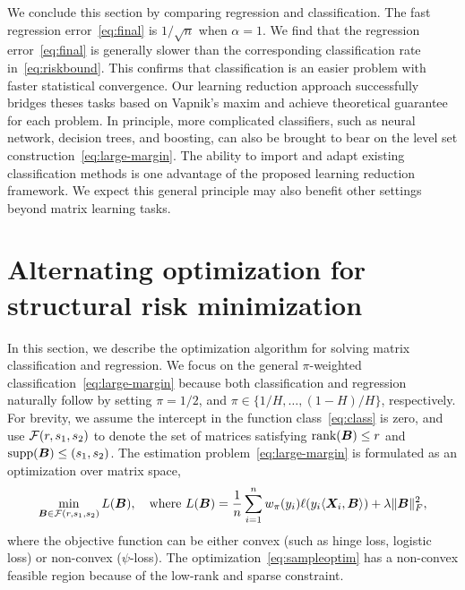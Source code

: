 \documentclass[11pt]{article}
\theoremstyle{definition}
\begin{document}
We conclude this section by comparing regression and classification. The fast regression error~\eqref{eq:final} is $1/\sqrt{n}$ when $\alpha=1$. 
We find that the regression error~\eqref{eq:final} is generally slower than the corresponding classification rate in~\eqref{eq:riskbound}. This confirms that classification is an easier problem with faster statistical convergence. Our learning reduction approach successfully bridges theses tasks based on Vapnik's maxim and achieve theoretical guarantee for each problem. In principle, more complicated classifiers, such as neural network, decision trees, and boosting, can also be brought to bear on the level set construction~\eqref{eq:large-margin}. The ability to import and adapt existing classification methods is one advantage of the proposed learning reduction framework. We expect this general principle may also benefit other settings beyond matrix learning tasks.  

\section{Alternating optimization for  structural risk minimization}
In this section, we describe the optimization algorithm for solving matrix classification and regression. We focus on the general $\pi$-weighted classification~\eqref{eq:large-margin} because both classification and regression naturally follow by setting $\pi=1/2$, and $\pi\in\{1/H,\ldots,(1-H)/H\}$, respectively. For brevity, we assume the intercept in the function class~\eqref{eq:class} is zero, and use $\mathcal{F}(r,s_1,s_2)$ to denote the set of matrices satisfying $\text{rank}(\bm B)\leq r$ and $\text{supp}(\bm B)\leq (s_1,s_2)$. The estimation problem~\eqref{eq:large-margin} is formulated as an optimization over matrix space,
\begin{equation}\label{eq:sampleoptim}
\min_{\bm B \in \mathcal{F}(r,s_1,s_2)}L(\bm B),\quad \text{where }L(\bm B)={1\over n}\sum_{i=1}^nw_\pi(y_i)\ell(y_i\langle \bm X_i,\bm B \rangle) + \lambda\lVert\bm B\rVert_F^2,
\end{equation}
where the objective function can be either convex (such as hinge loss, logistic loss) or non-convex ($\psi$-loss). The optimization~\eqref{eq:sampleoptim} has a non-convex feasible region because of the low-rank and sparse constraint. 
\end{document}
